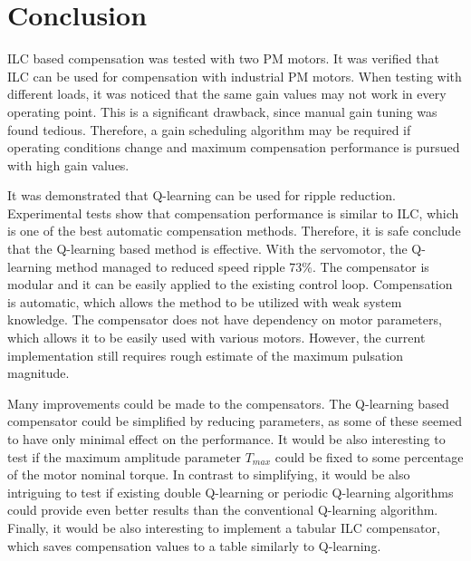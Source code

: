 
\section{Conclusion} 

ILC based compensation was tested with two PM motors. It was verified that ILC can be used for compensation with industrial PM motors. When testing with different loads, it was noticed that the same gain values may not work in every operating point. This is a significant drawback, since manual gain tuning was found tedious. Therefore, a gain scheduling algorithm may be required if operating conditions change and maximum compensation performance is pursued with high gain values.

It was demonstrated that Q-learning can be used for ripple reduction. Experimental tests show that compensation performance is similar to ILC, which is one of the best automatic compensation methods. Therefore, it is safe conclude that the Q-learning based method is effective. With the servomotor, the Q-learning method managed to reduced speed ripple 73\%. The compensator is modular and it can be easily applied to the existing control loop. Compensation is automatic, which allows the method to be utilized with weak system knowledge. The compensator does not have dependency on motor parameters, which allows it to be easily used with various motors. However, the current implementation still requires rough estimate of the maximum pulsation magnitude.

Many improvements could be made to the compensators. The Q-learning based compensator could be simplified by reducing parameters, as some of these seemed to have only minimal effect on the performance. It would be also interesting to test if the maximum amplitude parameter $T_{max}$ could be fixed to some percentage of the motor nominal torque. In contrast to simplifying, it would be also intriguing to test if existing double Q-learning or periodic Q-learning algorithms could provide even better results than the conventional Q-learning algorithm. Finally, it would be also interesting to implement a tabular ILC compensator, which saves compensation values to a table similarly to Q-learning. 
\clearpage
